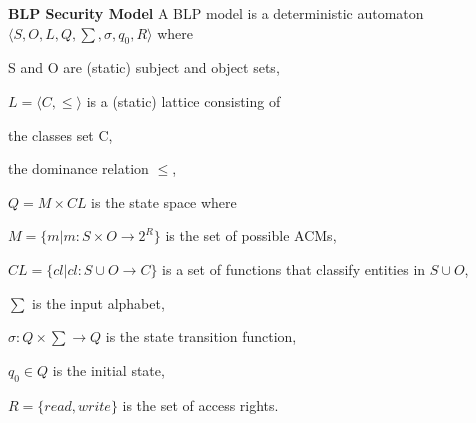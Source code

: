 \documentclass[a4paper]{article}
\renewcommand{\note}[2]{\begin{noteBox} \textbf{#1} #2 \end{noteBox}}
\begin{document}
\begin{multicols}{3}
    \note{BLP Security Model}{A BLP model is a deterministic automaton $\langle S,O,L,Q,\sum,\sigma,q_0,R\rangle$ where
        \begin{itemize*}
            \item S and O are (static) subject and object sets,
            \item $L=\langle C,\leq\rangle$ is a (static) lattice consisting of
            \begin{itemize*}
                \item the classes set C,
                \item the dominance relation $\leq$,
            \end{itemize*}
            \item $Q=M\times CL$ is the state space where
            \begin{itemize*}
                \item $M=\{m|m:S\times O\rightarrow 2^R\}$ is the set of possible ACMs,
                \item $CL=\{cl|cl:S\cup O\rightarrow C\}$ is a set of functions that classify entities in $S\cup O$,
            \end{itemize*}
            \item $\sum$ is the input alphabet,
            \item $\sigma:Q\times \sum\rightarrow Q$ is the state transition function,
            \item $q_0\in Q$ is the initial state,
            \item $R=\{read,write\}$ is the set of access rights.
        \end{itemize*}
    }


\end{multicols}
\end{document}
